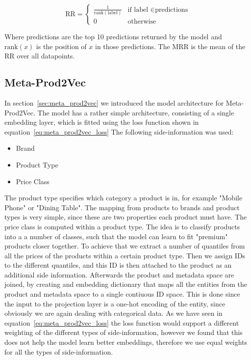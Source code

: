 \begin{equation}\label{eq:reciprocal_rank}
    \text{RR} = 
    \begin{cases}
        \frac{1}{\text{rank}(\text{label})} & \text{if label } \in \text{predictions} \\
        0 & \text{otherwise}
    \end{cases}
\end{equation}

Where predictions are the top 10 predictions returned by the model and $\text{rank}(x)$ is the position of $x$ in those predictions.
The MRR is the mean of the RR over all datapoints.

\subsection{Meta-Prod2Vec}
In section~\ref{sec:meta_prod2vec} we introduced the model architecture for Meta-Prod2Vec.
The model has a rather simple architecture, consisting of a single embedding layer, which is fitted using the loss function shown in equation~\ref{eq:meta_prod2vec_loss}
The following side-information was used:
\begin{itemize}
    \item Brand
    \item Product Type
    \item Price Class
\end{itemize}
The product type specifies which category a product is in, for example "Mobile Phone" or "Dining Table".
The mapping from products to brands and product types is very simple, since these are two properties each product must have.
The price class is computed within a product type.
The idea is to classify products into a a number of classes, such that the model can learn to fit "premium" products closer together.
To achieve that we extract a number of quantiles from all the prices of the products within a certain product type.
Then we assign IDs to the different quantiles, and this ID is then attached to the product as an additional side information.
Afterwards the product and metadata space are joined, by creating and embedding dictionary that maps all the entities from the product and metadata space to a single contiuous ID space.
This is done since the input to the projection layer is a one-hot encoding of the entity, since obviously we are again dealing with categorical data.
As we have seen in equation~\ref{eq:meta_prod2vec_loss} the loss function would support a different weighting of the different types of side-information, however we found that this does not help the model learn better embeddings, therefore we use equal weights for all the types of side-information.
